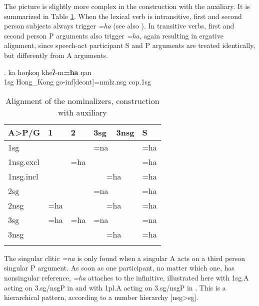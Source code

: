  
The picture is slightly more complex in the construction with the auxiliary. It is summarized in 
Table \ref{nom-align}. When the lexical verb is intransitive, first and second person subjects always trigger \emph{=ha} (see also \Next). In transitive verbs, first and second person P arguments also trigger \emph{=ha}, again resulting in ergative alignment, since speech-act participant S and P arguments are treated identically, but differently from A arguments. 

\exg. ka hoŋkoŋ kheʔ-m{\bf =ha} ŋan\\
{\sc 1sg} Hong\_Kong go-{\sc inf[deont]=nmlz.nsg} {\sc cop.1sg}\\


\begin{table}[htp]
\begin{center}
\begin{tabular}{llllll}
\lsptoprule
{\bf A>P/G} 	&	1&2&{\sc 3sg}&{\sc 3nsg}&S\\
\midrule
{\sc }1sg  		& \cellcolor[gray]{.8}&&=na &  &=ha \\
 {\sc 1nsg.excl}   &	\cellcolor[gray]{.8}&=ha 				&\multicolumn{2}{c}{}&=ha\\
{\sc 1nsg.incl}   	&\multicolumn{2}{c}{\cellcolor[gray]{.8}}		& \multicolumn{2}{c}{=ha}&=ha\\
\midrule
{\sc 2sg}  		&    & \cellcolor[gray]{.8}	&=na& & =ha\\
{\sc 2nsg}  		& =ha  & \cellcolor[gray]{.8}	&\multicolumn{2}{c}{=ha}&=ha\\
\midrule
{\sc 3sg}  	& =ha&=ha &=na&&=na\\
{\sc 3nsg} 	&	& 	&\multicolumn{2}{c}{=ha}&=ha \\
\lspbottomrule
\end{tabular}
\caption{Alignment  of the nominalizers, construction with auxiliary}\label{nom-align}
\end{center}
\end{table}

The singular clitic \emph{=na} is only found when a singular A acts on a third person singular P argument. As soon as one participant, no matter which one, has nonsingular reference, \emph{=ha} attaches to the infinitive, illustrated here with {\sc 1sg.A} acting on {\sc 3.sg/nsgP} in \Next and with {\sc 1pl.A} acting on {\sc 3.sg/nsgP}  in \NNext. This is a hierarchical pattern, according to a number hierarchy [nsg>sg].

